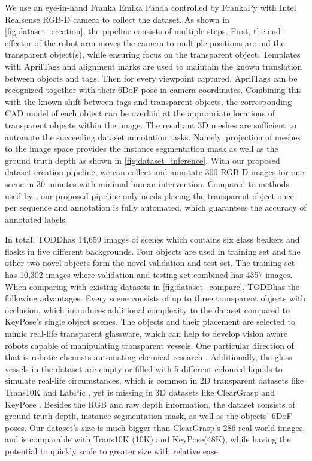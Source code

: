 \documentclass{article}
\newcommand{\dataName}{TODD}
\begin{document}
We use an eye-in-hand Franka Emika Panda controlled by FrankaPy\citep{frankapy} with Intel Realsense RGB-D camera to collect the dataset. As shown in \autoref{fig:dataset_creation}, the pipeline consists of multiple steps. First, the end-effector of the robot arm moves the camera to multiple positions around the transparent object(s), while ensuring focus on the transparent object. Templates with AprilTags \citep{apriltag2} and alignment marks are used to maintain the known translation between objects and tags. Then for every viewpoint captured, AprilTags can be recognized together with their 6DoF pose in camera coordinates. Combining this with the known shift between tags and transparent objects, the corresponding CAD model of each object can be overlaid at the appropriate locations of transparent objects within the image. The resultant 3D meshes are sufficient to automate the succeeding dataset annotation tasks. Namely, projection of meshes to the image space provides the instance segmentation mask as well as the ground truth depth as shown in \autoref{fig:dataset_inference}. With our proposed dataset creation pipeline, we can collect and annotate 300 RGB-D images for one scene in 30 minutes with minimal human intervention. Compared to methods used by \cite{ClearGrasp, TransLab, Keypose}, our proposed pipeline only needs placing the transparent object once per sequence and annotation is fully automated, which guarantees the accuracy of annotated labels.

In total, \dataName has 14,659 images of scenes which contains six glass beakers and flasks in five different backgrounds. Four objects are used in training set and the other two novel objects form the novel validation and test set. The training set has 10,302 images where validation and testing set combined has 4357 images. When comparing with existing datasets in \autoref{fig:dataset_compare}, \dataName has the following advantages. Every scene consists of up to three transparent objects with occlusion, which introduces additional complexity to the dataset compared to KeyPose's \citep{Keypose} single object scenes. The objects and their placement are selected to mimic real-life transparent glassware, which can help to develop vision aware robots capable of manipulating transparent vessels. One particular direction of that is robotic chemists automating chemical research \citep{mobilechemist}. Additionally, the glass vessels in the dataset are empty or filled with 5 different coloured liquids to simulate real-life circumstances, which is common in 2D transparent datasets like Trans10K \citep{xie2021segmenting} and LabPic \citep{LabPic}, yet is missing in 3D datasets like ClearGrasp \citep{ClearGrasp} and KeyPose \citep{Keypose}. Besides the RGB and raw depth information, the dataset consists of ground truth depth, instance segmentation mask, as well as the objects' 6DoF poses. Our dataset's size is much bigger than ClearGrasp's \citep{ClearGrasp} 286 real world images, and is comparable with Trans10K (10K) \citep{xie2021segmenting} and KeyPose(48K)\citep{Keypose}, while having the potential to quickly scale to greater size with relative ease.
\end{document}

